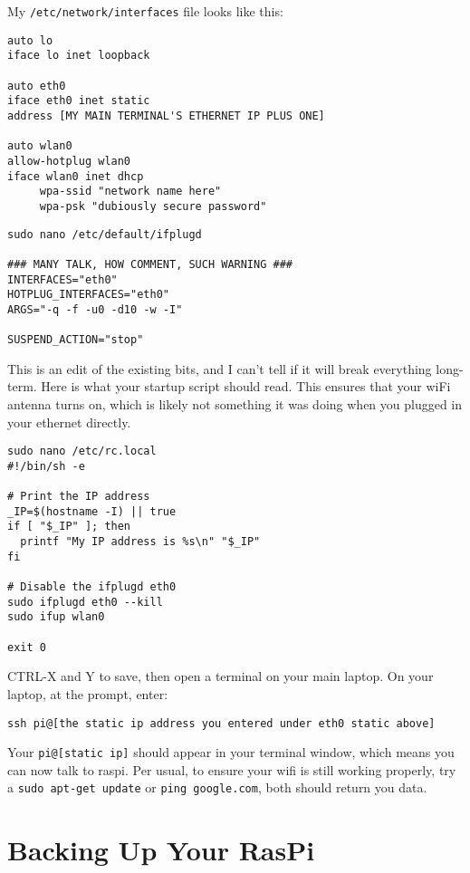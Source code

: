 My \texttt{/etc/network/interfaces} file looks like this:
\begin{lstlisting}
auto lo
iface lo inet loopback

auto eth0
iface eth0 inet static
address [MY MAIN TERMINAL'S ETHERNET IP PLUS ONE]

auto wlan0
allow-hotplug wlan0
iface wlan0 inet dhcp
     wpa-ssid "network name here"
     wpa-psk "dubiously secure password"
\end{lstlisting}
 

\begin{lstlisting}
sudo nano /etc/default/ifplugd

### MANY TALK, HOW COMMENT, SUCH WARNING ###
INTERFACES="eth0"
HOTPLUG_INTERFACES="eth0"
ARGS="-q -f -u0 -d10 -w -I"

SUSPEND_ACTION="stop"
\end{lstlisting}

This is an edit of the existing bits, and I can't tell if it will break everything long-term.
Here is what your startup script should read. This ensures that your wiFi antenna turns on, which is likely not something it was doing when you plugged in your ethernet directly.

\begin{lstlisting}
sudo nano /etc/rc.local
#!/bin/sh -e

# Print the IP address
_IP=$(hostname -I) || true
if [ "$_IP" ]; then
  printf "My IP address is %s\n" "$_IP"
fi

# Disable the ifplugd eth0
sudo ifplugd eth0 --kill
sudo ifup wlan0

exit 0
\end{lstlisting}

CTRL-X and Y to save, then  open a terminal on your main laptop. On your laptop, at the prompt, enter:
\begin{lstlisting}
ssh pi@[the static ip address you entered under eth0 static above]
\end{lstlisting}

Your \texttt{pi@[static ip]} should appear in your terminal window, which means you can now talk to raspi.
Per usual, to ensure your wifi is still working properly, try a \texttt{sudo apt-get update} or \texttt{ping google.com}, both should return you data.

\section{Backing Up Your RasPi}

